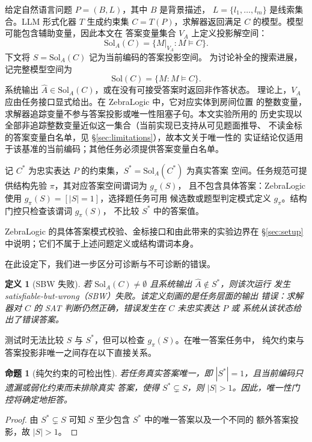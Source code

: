 \documentclass[letterpaper]{article}
\newcommand{\sbw}{SBW}
\newcommand{\Sol}{\mathrm{Sol}}
\newcommand{\AnsSol}{\mathrm{Sol}_{A}}
\newtheorem{definition}{定义}
\newtheorem{proposition}{命题}
\begin{document}
给定自然语言问题 $P=(B,L)$，其中 $B$ 是背景描述，
$L=\{l_1,\ldots,l_m\}$ 是线索集合。LLM 形式化器 $T$ 生成约束集
$C=T(P)$，求解器返回满足 $C$ 的模型。模型可能包含辅助变量，因此本文在
答案变量集合 $V_A$ 上定义投影解空间：
\begin{equation}
  \AnsSol(C)=\{M|_{V_A}: M\models C\}.
\end{equation}
下文将 $S=\AnsSol(C)$ 记为当前编码的答案投影空间。
为讨论补全的搜索进展，记完整模型空间为
\begin{equation}
  \Sol(C)=\{M:M\models C\}.
\end{equation}
系统输出 $\hat A\in\AnsSol(C)$，或在没有可接受答案时返回非作答状态。
理论上，$V_A$ 应由任务接口显式给出。在 ZebraLogic 中，它对应实体到房间位置
的整数变量，求解器追踪变量不参与答案投影或唯一性阻塞子句。本文实验所用的
历史实现以全部非追踪整数变量近似这一集合（当前实现已支持从可见题面推导、
不读金标的答案变量白名单，见 \S\ref{sec:limitations}），故本文关于唯一性的
实证结论仅适用于该基准的当前编码；其他任务必须提供答案变量白名单。

记 $C^{*}$ 为忠实表达 $P$ 的约束集，$S^{*}=\AnsSol(C^{*})$ 为真实答案
空间。任务规范可提供结构先验 $\pi$，其对应答案空间谓词为 $g_{\pi}(S)$，
且不包含具体答案：ZebraLogic 使用 $g_{\pi}(S)=[|S|=1]$，选择题任务可用
候选数或题型判定模式定义 $g_{\pi}$。结构门控只检查该谓词 $g_{\pi}(S)$，
不比较 $S^{*}$ 中的答案值。

ZebraLogic 的具体答案模式校验、金标接口和由此带来的实验边界在
\S\ref{sec:setup} 中说明；它们不属于上述问题定义或结构谓词本身。

在此设定下，我们进一步区分可诊断与不可诊断的错误。
\label{sec:prior}

\begin{definition}[\sbw{} 失败]
\label{def:sbw}
若 $\AnsSol(C)\neq\emptyset$ 且系统输出 $\hat A\notin S^{*}$，则该次运行
发生 satisfiable-but-wrong（\sbw）失败。该定义刻画的是任务层面的输出
错误：求解器对 $C$ 的 SAT 判断仍然正确，错误发生在 $C$ 未忠实表达 $P$ 或
系统从该状态给出了错误答案。
\end{definition}

测试时无法比较 $S$ 与 $S^{*}$，但可以检查 $g_{\pi}(S)$。在唯一答案任务中，
纯欠约束与答案投影非唯一之间存在以下直接关系。

\begin{proposition}[纯欠约束的可检出性]
\label{prop:underconstraint}
若任务真实答案唯一，即 $|S^{*}|=1$，且当前编码只遗漏或弱化约束而未排除真实
答案，使得 $S^{*}\subsetneq S$，则 $|S|>1$。因此，唯一性门控将确定地拒答。
\end{proposition}
\begin{proof}
由 $S^{*}\subsetneq S$ 可知 $S$ 至少包含 $S^{*}$ 中的唯一答案以及一个不同的
额外答案投影，故 $|S|>1$。
\end{proof}
\end{document}
